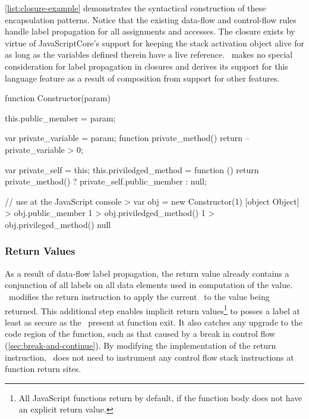 \autoref{list:closure-example} demonstrates the syntactical construction of these encapsulation patterns.
Notice that the existing data-flow and control-flow rules handle label propagation for all assignments and accesses.
The closure exists by virtue of JavaScriptCore's support for keeping the stack activation object alive for as long as the variables defined therein have a live reference.
\FlowCore\ makes no special consideration for label propagation in closures and derives its support for this language feature as a result of composition from support for other features.

\begin{jscode}
function Constructor(param) {
    this.public_member = param;

    var private_variable = param;
    function private_method() {
        return --private_variable > 0;
    }

    var private_self = this;
    this.priviledged_method = function () {
        return private_method() ? private_self.public_member : null;
    }
}

// use at the JavaScript console
> var obj = new Constructor(1)
[object Object]
> obj.public_member
1
> obj.priviledged_method()
1
> obj.privileged_method()
null
\end{jscode}

\subsubsection{Return Values}

As a result of data-flow label propagation, the return value already contains a conjunction of all labels on all data elements used in computation of the value.
\FlowCore\ modifies the return instruction to apply the current \pclabel\ to the value being returned.
This additional step enables implicit return values\footnote{All JavaScript functions return  by default, if the function body does not have an explicit return value.} to posses a label at least as secure as the \pclabel\ present at function exit.
It also catches any upgrade to the code region of the function, such as that caused by a break in control flow (\autoref{sec:break-and-continue}).
By modifying the implementation of the return instruction, \FlowCore\ does not need to instrument any control flow stack instructions at function return sites.

